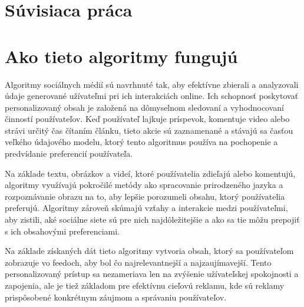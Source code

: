 \documentclass[12pt,twoside,slovak,a4paper]{article}
\begin{document}
\section{Súvisiaca práca} 
\cite{7809906}
\cite{7087040}

%
%
%
%
%
%
%
%
%


\section{Ako tieto algoritmy fungujú}
Algoritmy sociálnych médií sú navrhnuté tak, aby efektívne zbierali a analyzovali údaje generované užívateľmi pri ich interakciách online. Ich schopnosť poskytovať personalizovaný obsah je založená na dômyselnom sledovaní a vyhodnocovaní činností používateľov. Keď používateľ lajkuje príspevok, komentuje video alebo strávi určitý čas čítaním článku, tieto akcie sú zaznamenané a stávajú sa časťou veľkého údajového modelu, ktorý tento algoritmus používa na pochopenie a predvídanie preferencií používateľa.

Na základe textu, obrázkov a videí, ktoré používatelia zdieľajú alebo komentujú, algoritmy využívajú pokročilé metódy ako spracovanie prirodzeného jazyka a rozpoznávanie obrazu na to, aby lepšie porozumeli obsahu, ktorý používatelia preferujú. Algoritmy zároveň skúmajú vzťahy a interakcie medzi používateľmi, aby zistili, aké sociálne siete sú pre nich najdôležitejšie a ako sa tie môžu prepojiť s ich obsahovými preferenciami.

Na základe získaných dát tieto algoritmy vytvoria obsah, ktorý sa používateľom zobrazuje vo feedoch, aby bol čo najrelevantnejší a najzaujímavejší. Tento personalizovaný prístup sa nezameriava len na zvýšenie užívateľskej spokojnosti a zapojenia, ale je tiež základom pre efektívnu cieľovú reklamu, kde sú reklamy prispôsobené konkrétnym záujmom a správaniu používateľov.
\end{document}
